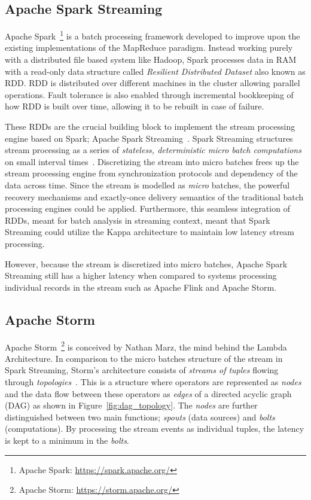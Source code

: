 \subsection{Apache Spark Streaming}%
\label{sub:Apache Spark}
Apache Spark~\footnote{Apache Spark: \url{https://spark.apache.org/}} is a batch 
processing framework developed to improve upon the existing implementations of the 
MapReduce paradigm. Instead working purely with a distributed file based system like 
Hadoop, Spark processes data in RAM with a read-only data structure called 
\emph{Resilient Distributed Dataset} also known as RDD. RDD is distributed over 
different machines in the cluster allowing parallel operations. Fault tolerance 
is also enabled through incremental bookkeeping of how RDD is built over time, allowing 
it to be rebuilt in case of failure.

These RDDs are the crucial building block to implement the stream processing engine 
based on Spark; Apache Spark Streaming~\cite{spark_streaming}. Spark Streaming structures
stream processing as a series of \emph{stateless, deterministic micro batch
computations} on small interval times~\cite{spark_streaming}. Discretizing the stream 
into micro batches frees up the stream processing engine from synchronization protocols 
and dependency of the data across time. Since the stream is modelled as \emph{micro} 
batches, the powerful recovery mechanisms and exactly-once delivery semantics of the traditional batch processing engines could
be applied. 
Furthermore, this seamless integration of RDDs, meant for batch analysis in 
streaming context, meant that Spark Streaming could utilize the Kappa architecture 
to maintain low latency stream processing. 

However, because the stream is discretized into micro batches, Apache Spark Streaming still has a 
higher latency when compared to systems processing individual records in the stream
such as Apache Flink and Apache Storm. 


\subsection{Apache Storm}%
\label{sub:Apache Storm}

Apache Storm~\footnote{Apache Storm: \url{https://storm.apache.org/}} is 
conceived by Nathan Marz, the mind behind the Lambda Architecture. In comparison to 
the micro batches structure of the stream in Spark Streaming, Storm's architecture 
consists of \emph{streams of tuples} flowing through
\emph{topologies}~\cite{storm_twitter}. This is a structure where operators are 
represented as \emph{nodes} and the data flow between these operators as \emph{edges} of 
a directed acyclic graph (DAG) as shown in Figure~\ref{fig:dag_topology}. 
The \emph{nodes} are further distinguished between 
two main functions; \emph{spouts} (data sources) and \emph{bolts} (computations).  
By processing the stream events as individual tuples, the latency is kept 
to a minimum in the \emph{bolts}. 

